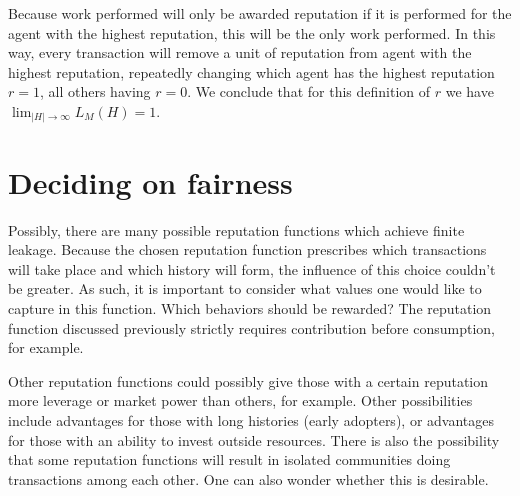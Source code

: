 Because work performed will only be awarded reputation if it is performed for the agent with the highest reputation, this will be the only work performed. In this way, every transaction will remove a unit of reputation from agent with the highest reputation, repeatedly changing which agent has the highest reputation $r = 1$, all others having $r = 0$. We conclude that for this definition of $r$ we have $\lim_{|H| \to \infty} L_M(H) = 1$.

\section{Deciding on fairness}
Possibly, there are many possible reputation functions which achieve finite leakage. Because the chosen reputation function prescribes which transactions will take place and which history will form, the influence of this choice couldn't be greater. As such, it is important to consider what values one would like to capture in this function. Which behaviors should be rewarded? The reputation function discussed previously strictly requires contribution before consumption, for example.

Other reputation functions could possibly give those with a certain reputation more leverage or market power than others, for example. Other possibilities include advantages for those with long histories (early adopters), or advantages for those with an ability to invest outside resources. There is also the possibility that some reputation functions will result in isolated communities doing transactions among each other. One can also wonder whether this is desirable.